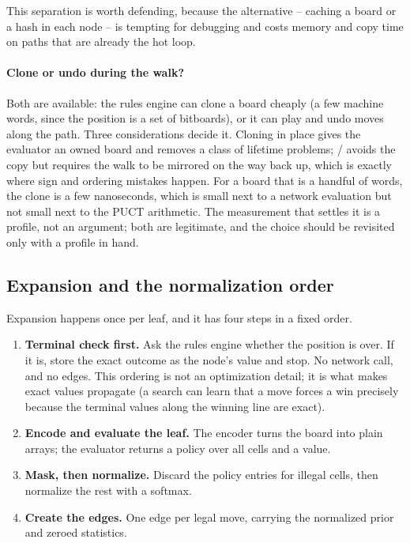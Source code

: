 This separation is worth defending, because the alternative -- caching a board or
a hash in each node -- is tempting for debugging and costs memory and copy time
on paths that are already the hot loop.

\paragraph{Clone or undo during the walk?} Both are available: the rules engine
can clone a board cheaply (a few machine words, since the position is a set of
bitboards), or it can play and undo moves along the path. Three considerations
decide it. Cloning in place gives the evaluator an owned board and removes a
class of lifetime problems; / avoids the copy but requires
the walk to be mirrored on the way back up, which is exactly where sign and
ordering mistakes happen. For a board that is a handful of  words, the
clone is a few nanoseconds, which is small next to a network evaluation but not
small next to the PUCT arithmetic. The measurement that settles it is a
profile, not an argument; both are legitimate, and the choice should be
revisited only with a profile in hand.

\subsection{Expansion and the normalization order}
\label{sec:expand}

Expansion happens once per leaf, and it has four steps in a fixed order.

\begin{enumerate}
  \item \textbf{Terminal check first.} Ask the rules engine whether the position
        is over. If it is, store the exact outcome as the node's value and stop.
        No network call, and no edges. This ordering is not an optimization
        detail; it is what makes exact values propagate (a search can learn that a
        move forces a win precisely because the terminal values along the winning
        line are exact).
  \item \textbf{Encode and evaluate the leaf.} The encoder turns the board into
        plain arrays; the evaluator returns a policy over all cells and a value.
  \item \textbf{Mask, then normalize.} Discard the policy entries for illegal
        cells, then normalize the rest with a softmax.
  \item \textbf{Create the edges.} One edge per legal move, carrying the
        normalized prior and zeroed statistics.
\end{enumerate}

